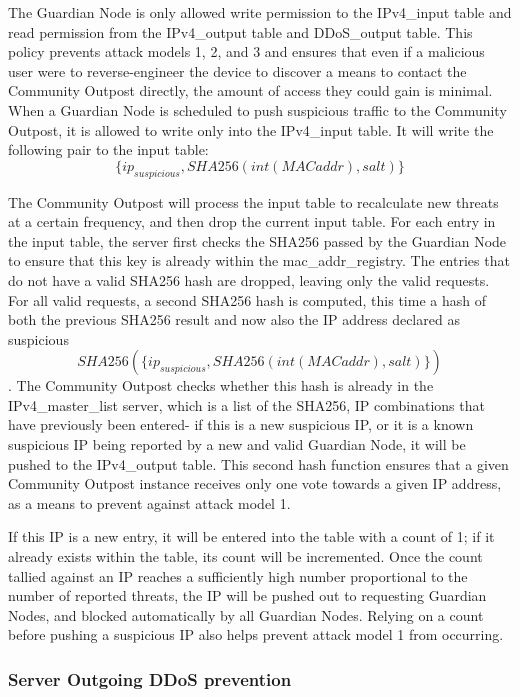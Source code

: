 The Guardian Node is only allowed write permission to the IPv4_input table and read permission from the IPv4_output table and DDoS_output table. This policy prevents attack models 1, 2, and 3 and ensures that even if a malicious user were to reverse-engineer the device to discover a means to contact the Community Outpost directly, the amount of access they could gain is minimal. When a Guardian Node is scheduled to push suspicious traffic to the Community Outpost, it is allowed to write only into the IPv4_input table. It will write the following pair to the input table: \[\{ip_{suspicious}, SHA256(int(MAC addr), salt)\}\] 

The Community Outpost will process the input table to recalculate new threats at a certain frequency, and then drop the current input table. For each entry in the input table, the server first checks the SHA256 passed by the Guardian Node to ensure that this key is already within the mac_addr_registry. The entries that do not have a valid SHA256 hash are dropped, leaving only the valid requests. For all valid requests, a second SHA256 hash is computed, this time a hash of both the previous SHA256 result and now also the IP address declared as suspicious \[SHA256(\{ip_{suspicious}, SHA256(int(MAC addr), salt)\}) \]. The Community Outpost checks whether this hash is already in the IPv4_master_list server, which is a list of the SHA256, IP combinations that have previously been entered- if this is a new suspicious IP, or it is a known suspicious IP being reported by a new and valid Guardian Node, it will be pushed to the IPv4_output table. This second hash function ensures that a given Community Outpost instance receives only one vote towards a given IP address, as a means to prevent against attack model 1. 

If this IP is a new entry, it will be entered into the table with a count of 1; if it already exists within the table, its count will be incremented. Once the count tallied against an IP reaches a sufficiently high number proportional to the number of reported threats, the IP will be pushed out to requesting Guardian Nodes, and blocked automatically by all Guardian Nodes. Relying on a count before pushing a suspicious IP also helps prevent attack model 1 from occurring. 

\subsubsection{Server Outgoing DDoS prevention}
\label{sec:design:serverddos}

